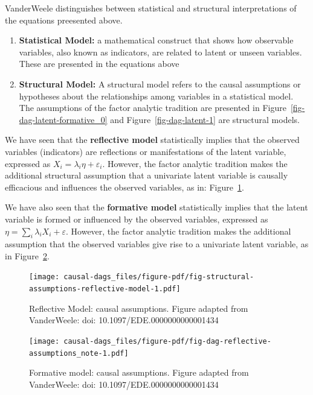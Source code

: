 \documentclass[
  singlecolumn]{report}
\begin{document}
VanderWeele distinguishes between statistical and structural
interpretations of the equations preesented above.

\begin{enumerate}
\def\labelenumi{\arabic{enumi}.}
\item
  \textbf{Statistical Model:} a mathematical construct that shows how
  observable variables, also known as indicators, are related to latent
  or unseen variables. These are presented in the equations above
\item
  \textbf{Structural Model:} A structural model refers to the causal
  assumptions or hypotheses about the relationships among variables in a
  statistical model. The assumptions of the factor analytic tradition
  are presented in Figure~\ref{fig-dag-latent-formative_0} and
  Figure~\ref{fig-dag-latent-1} are structural models.
\end{enumerate}

We have seen that the \textbf{reflective model} statistically implies
that the observed variables (indicators) are reflections or
manifestations of the latent variable, expressed as
\(X_i = \lambda_i \eta + \varepsilon_i\). However, the factor analytic
tradition makes the additional structural assumption that a univariate
latent variable is causally efficacious and influences the observed
variables, as in:
Figure~\ref{fig-structural-assumptions-reflective-model}.

We have also seen that the \textbf{formative model} statistically
implies that the latent variable is formed or influenced by the observed
variables, expressed as \(\eta = \sum_i\lambda_i X_i + \varepsilon\).
However, the factor analytic tradition makes the additional assumption
that the observed variables give rise to a univariate latent variable,
as in Figure~\ref{fig-dag-reflective-assumptions_note}.

\begin{figure}

{\centering \texttt{[image: causal-dags\_files/figure-pdf/fig-structural-assumptions-reflective-model-1.pdf]}

}

\caption{\label{fig-structural-assumptions-reflective-model}Reflective
Model: causal assumptions. Figure adapted from VanderWeele: doi:
10.1097/EDE.0000000000001434}

\end{figure}

\begin{figure}

{\centering \texttt{[image: causal-dags\_files/figure-pdf/fig-dag-reflective-assumptions\_note-1.pdf]}

}

\caption{\label{fig-dag-reflective-assumptions_note}Formative model:
causal assumptions. Figure adapted from VanderWeele: doi:
10.1097/EDE.0000000000001434}

\end{figure}
\end{document}
